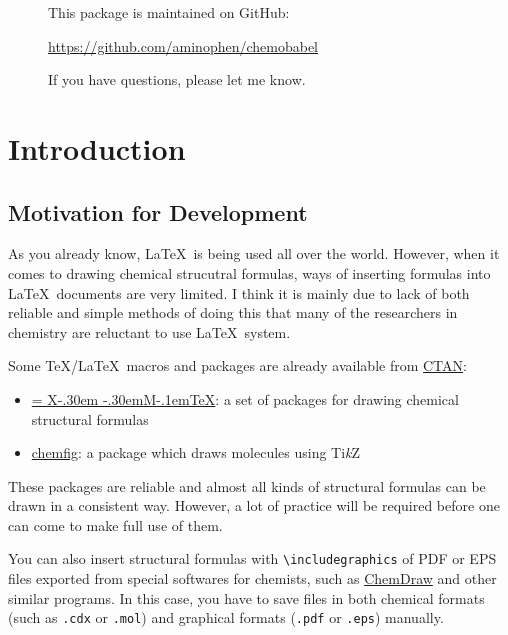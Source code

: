 \documentclass[12pt]{ltjsarticle}
\def\XyM{\ifnum\fam=-1\relax\fam=0\relax\fi\TestCount=\fam%
X\kern-.30em\smash{\raise.50ex\hbox{$\fam\TestCount\Upsilon$}}%
\kern-.30em{M}}
\def\XyMTeX{\XyM\kern-.1em\TeX}
\begin{document}
\begin{figure}[ht]
\centering
This package is maintained on GitHub:\par
\url{https://github.com/aminophen/chemobabel}\par
If you have questions, please let me know.
\end{figure}

\clearpage
\setcounter{tocdepth}{3}
\tableofcontents

\clearpage
{}

\section{Introduction}

\subsection{Motivation for Development}

As you already know, \LaTeX\ is being used all over the world.
However, when it comes to drawing chemical strucutral formulas,
ways of inserting formulas into \LaTeX\ documents are very limited.
I think it is mainly due to lack of both reliable and simple methods
of doing this that many of the researchers in chemistry are reluctant
to use \LaTeX\ system.

Some \TeX/\LaTeX\ macros and packages are already available from
\href{http://www.ctan.org/}{CTAN}:
\begin{itemize}
  \item \href{http://www.ctan.org/pkg/xymtex}{\XyMTeX}:
    a set of packages for drawing chemical structural formulas
\item \href{http://www.ctan.org/pkg/chemfig}{\textsf{chemfig}}:
    a package which draws molecules using Ti\textit{k}Z
\end{itemize}
These packages are reliable and almost all kinds of structural formulas
can be drawn in a consistent way. However, a lot of practice will be
required before one can come to make full use of them.

You can also insert structural formulas with \verb|\includegraphics| of
PDF or EPS files exported from special softwares for chemists, such as
\href{http://www.cambridgesoft.com/Ensemble_for_Chemistry/ChemDraw/}{ChemDraw}
and other similar programs.
In this case, you have to save files in both chemical formats
(such as \verb|.cdx| or \verb|.mol|) and graphical formats
(\verb|.pdf| or \verb|.eps|) manually.
\end{document}

